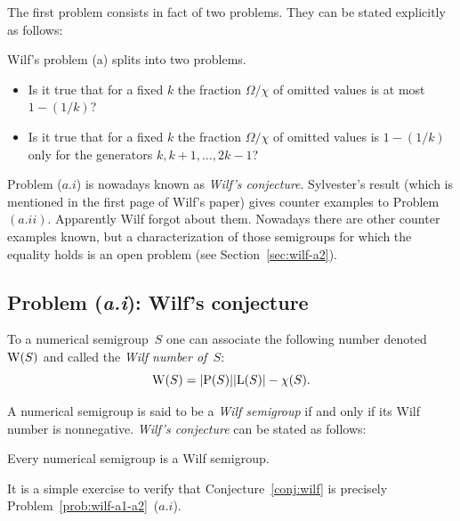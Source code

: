 The first problem consists in fact of two problems. They can be stated explicitly as follows:
\begin{problem}\label{prob:wilf-a1-a2} Wilf's problem (a) splits into two problems.
	\begin{itemize}
		\item[$(a.i)$] Is it true that for a fixed $k$ the fraction $\Omega/\chi$ of omitted values is at most $1-(1/k)$?
		\item[$(a.ii)$] Is it true that for a fixed $k$ the fraction $\Omega/\chi$ of omitted values is $1-(1/k)$ only for the generators $k,k+1,\ldots,2k-1$?
    \end{itemize}
\end{problem}

Problem ($a.i$) is nowadays known as \emph{Wilf's conjecture}.
Sylvester's result (which is mentioned in the first page of Wilf's paper) gives counter examples to Problem~$(a.ii)$. Apparently Wilf forgot about them. Nowadays there are other counter examples known, but a characterization of those semigroups for which the equality holds is an open problem (see Section~\ref{sec:wilf-a2}).

\subsection{Problem (\emph{a.i}): Wilf's conjecture}\label{sec:wilf-a1}
To a numerical semigroup~$S$ one can associate the following number denoted $\operatorname{W}(S)$ and called the \emph{Wilf number of~$S$}:
\begin{equation}\label{eq:wilf-number}
    \operatorname{W}(S) = \lvert \operatorname{P}(S) \rvert\lvert \operatorname{L}(S) \rvert-\operatorname{\chi}(S).
\end{equation}

A numerical semigroup is said to be a \emph{Wilf semigroup} if and only if its Wilf number is nonnegative.
\emph{Wilf's conjecture} can be stated as follows:
\begin{conjecture}[Wilf, 1978]\label{conj:wilf}
  Every numerical semigroup is a Wilf semigroup.
\end{conjecture}
It is a simple exercise to verify that Conjecture~\ref{conj:wilf} is precisely Problem~\ref{prob:wilf-a1-a2}~($a.i$).
\medskip

